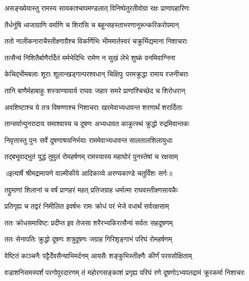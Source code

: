 \twolineshloka
{असङ्ख्येयास्तु रामस्य सायकाश्चापमण्डलात्}
{विनिष्पेतुरतीवोग्रा रक्षः प्राणापहारिणः} %

\twolineshloka
{तैर्धनूंषि ध्वजाग्राणि वर्माणि च शिरांसि च}
{बहून्सहस्ताभरणानूरून्करिकरोपमान्} %

\twolineshloka
{ततो नालीकनाराचैस्तीक्ष्णाग्रैश्च विकर्णिभिः}
{भीममार्तस्वरं चक्रुर्भिद्यमाना निशाचराः} %

\twolineshloka
{तत्सैन्यं निशितैर्बाणैरर्दितं मर्मभेदिभिः}
{रामेण न सुखं लेभे शुष्कं वनमिवाग्निना} %

\twolineshloka
{केचिद्भीमबलाः शूराः शूलान्खड्गान्परश्वधान्}
{चिक्षिपुः परमक्रुद्धा रामाय रजनीचराः} %

\twolineshloka
{तानि बाणैर्महाबाहुः शस्त्राण्यावार्य राघवः}
{जहार समरे प्राणांश्चिच्छेद च शिरोधरान्} %

\twolineshloka
{अवशिष्टाश्च ये तत्र विषण्णाश्च निशाचराः}
{खरमेवाभ्यधावन्त शरणार्थं शरार्दिताः} %

\twolineshloka
{तान्सर्वान्पुनरादाय समाश्वास्य च दूषणः}
{अभ्यधावत काकुत्स्थं क्रुद्धो रुद्रमिवान्तकः} %

\twolineshloka
{निवृत्तास्तु पुनः सर्वे दूषणाश्रयनिर्भयाः}
{राममेवाभ्यधावन्त सालतालशिलायुधाः} %

\twolineshloka
{तद्बभूवाद्भुतं युद्धं तुमुलं रोमहर्षणम्}
{रामस्यास्य महाघोरं पुनस्तेषां च रक्षसाम्} %


{॥इत्यार्षे श्रीमद्रामायणे वाल्मीकीये आदिकाव्ये अरण्यकाण्डे चतुर्विंशः सर्गः॥}


\twolineshloka
{तद्द्रुमाणां शिलानां च वर्षं प्राणहरं महत्}
{प्रतिजग्राह धर्मात्मा राघवस्तीक्ष्णसायकैः} %

\twolineshloka
{प्रतिगृह्य च तद्वरं निमीलित इवर्षभः}
{रामः क्रोधं परं भेजे वधार्थं सर्वरक्षसाम्} %

\twolineshloka
{ततः क्रोधसमाविष्टः प्रदीप्त इव तेजसा}
{शरैरभ्यकिरत्सैन्यं सर्वतः सहदूषणम्} %

\twolineshloka
{ततः सेनापतिः क्रुद्धो दूषणः शत्रुदूषणः}
{जग्राह गिरिशृङ्गाभं परिघं रोमहर्षणम्} %

\twolineshloka
{वेष्टितं काञ्चनैः पट्टैर्देवसैन्याभिमर्दनम्}
{आयसैः शङ्कुभिस्तीक्ष्णैः कीर्णं परवसोक्षिताम्} %

\threelineshloka
{वज्राशनिसमस्पर्शं परगोपुरदारणम्}
{तं महोरगसङ्काशं प्रगृह्य परिघं रणे}
{दूषणोऽभ्यपतद्रामं क्रूरकर्मा निशाचरः} %

